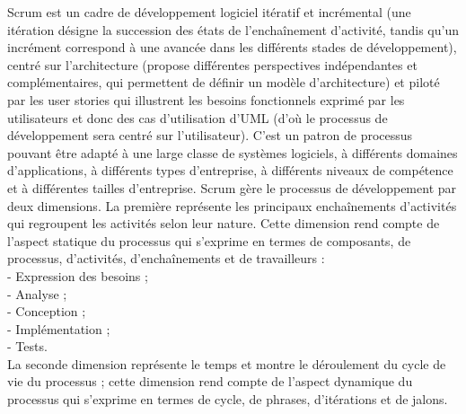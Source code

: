 	Scrum est un cadre de développement logiciel itératif et incrémental (une itération désigne la succession des états de l'enchaînement d’activité, tandis qu’un incrément correspond à une avancée dans les différents stades de développement), centré sur l’architecture (propose différentes perspectives indépendantes et complémentaires, qui permettent de définir un modèle d’architecture) et piloté par les user stories qui illustrent les besoins fonctionnels exprimé par les utilisateurs et donc des cas d’utilisation d’UML (d’où le processus de développement sera centré sur l’utilisateur). C’est un patron de processus pouvant être adapté à une large classe de systèmes logiciels, à différents domaines d’applications, à différents types d’entreprise, à différents niveaux de compétence et à différentes tailles d’entreprise. Scrum gère le processus de développement par deux dimensions. La première représente les principaux enchaînements d’activités qui regroupent les activités selon leur nature. Cette dimension rend compte de l’aspect statique du processus qui s’exprime en termes de composants, de processus, d’activités, d’enchaînements et de travailleurs : \\
		-  Expression des besoins ; \\
		-  Analyse ; \\
		-  Conception ; \\
		-  Implémentation ; \\
		-  Tests. \\
	La seconde dimension représente le temps et montre le déroulement du cycle de vie du processus ; cette dimension rend compte de l’aspect dynamique du processus qui s’exprime en termes de cycle, de phrases, d’itérations et de jalons. 

